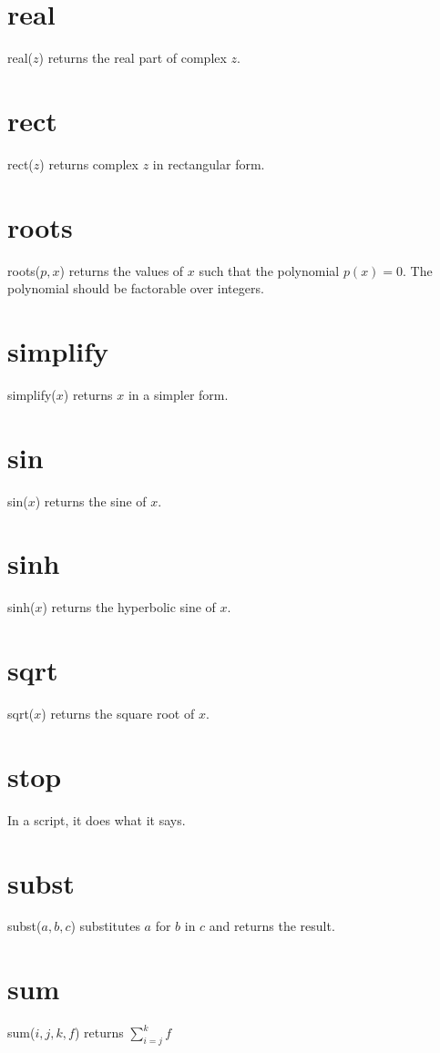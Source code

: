 \documentclass[12pt,openany]{report}
\begin{document}
\section*{real}
real($z$) returns the real part of complex $z$.

\section*{rect}
rect($z$) returns complex $z$ in rectangular form.

\section*{roots}
roots($p,x$) returns the values of $x$ such that the polynomial $p(x)=0$.
The polynomial should be factorable over integers.

\section*{simplify}
simplify($x$) returns $x$ in a simpler form.

\section*{sin}
sin($x$) returns the sine of $x$.

\section*{sinh}
sinh($x$) returns the hyperbolic sine of $x$.

\section*{sqrt}
sqrt($x$) returns the square root of $x$.

\section*{stop}
In a script, it does what it says.

\section*{subst}
subst($a,b,c$) substitutes $a$ for $b$ in $c$ and returns the result.

\section*{sum}
sum($i,j,k,f$) returns $\displaystyle\sum_{i=j}^k f$
\end{document}
